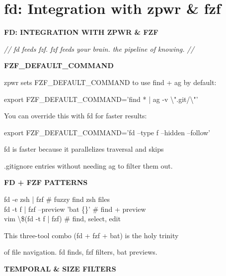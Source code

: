 \documentclass[11pt,a4paper,twoside]{book}
\begin{document}
\vspace{16pt}

\section{fd: Integration with zpwr \& fzf}


\vspace{10pt}
{\large\bfseries\color{neoncyan} FD: INTEGRATION WITH ZPWR \& FZF}\vspace{6pt}

{\small\itshape\color{dimtext} // fd feeds fzf. fzf feeds your brain. the pipeline of knowing. //}


\vspace{12pt}
{\bfseries\color{neonyellow} FZF\_DEFAULT\_COMMAND}\vspace{4pt}

zpwr sets FZF\_DEFAULT\_COMMAND to use find + ag by default:

export FZF\_DEFAULT\_COMMAND='find * | ag -v \textbackslash{}".git/\textbackslash{}"'

You can override this with fd for faster results:

\begin{codebox}
export FZF\_DEFAULT\_COMMAND='fd --type f --hidden --follow'\\
\end{codebox}

fd is faster because it parallelizes traversal and skips

.gitignore entries without needing ag to filter them out.


\vspace{12pt}
{\bfseries\color{neonyellow} FD + FZF PATTERNS}\vspace{4pt}

\begin{codebox}
fd -e zsh | fzf                 \# fuzzy find zsh files\\
fd -t f | fzf --preview 'bat \{\}'  \# find + preview\\
vim \textbackslash{}\$(fd -t f | fzf)             \# find, select, edit\\
\end{codebox}

This three-tool combo (fd + fzf + bat) is the holy trinity

of file navigation. fd finds, fzf filters, bat previews.


\vspace{12pt}
{\bfseries\color{neonyellow} TEMPORAL \& SIZE FILTERS}\vspace{4pt}
\end{document}
